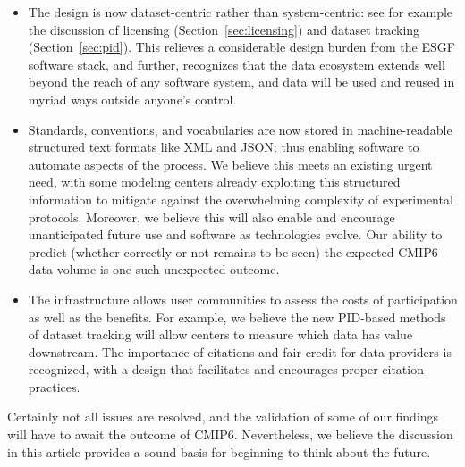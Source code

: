 \documentclass[gmd,manuscript]{copernicus}
\newcommand{\secref}[1] {\mbox{Section  \ref{sec:#1}}}
\begin{document}
\begin{itemize}
\item The design is now dataset-centric rather than system-centric:
  see for example the discussion of licensing (\secref{licensing}) and
  dataset tracking (\secref{pid}). This relieves a considerable design
  burden from the ESGF software stack, and further, recognizes that
  the data ecosystem extends well beyond the reach of any software
  system, and data will be used and reused in myriad ways outside
  anyone's control.
\item Standards, conventions, and vocabularies are now stored in
  machine-readable structured text formats like XML and JSON; thus
  enabling software to automate aspects of the process. We believe
  this meets an existing urgent need, with some modeling centers
  already exploiting this structured information to mitigate against
  the overwhelming complexity of experimental protocols. Moreover, we
  believe this will also enable and encourage unanticipated future use
  and software as technologies evolve. Our ability to predict (whether
  correctly or not remains to be seen) the expected CMIP6 data volume
  is one such unexpected outcome.
\item The infrastructure allows user communities to assess the costs
  of participation as well as the benefits. For example, we believe
  the new PID-based methods of dataset tracking will allow centers to
  measure which data has value downstream. The importance of citations
  and fair credit for data providers is recognized, with a design that
  facilitates and encourages proper citation practices.
\end{itemize}

Certainly not all issues are resolved, and the validation of some of
our findings will have to await the outcome of CMIP6. Nevertheless, we
believe the discussion in this article provides a sound basis for
beginning to think about the future.
\end{document}
